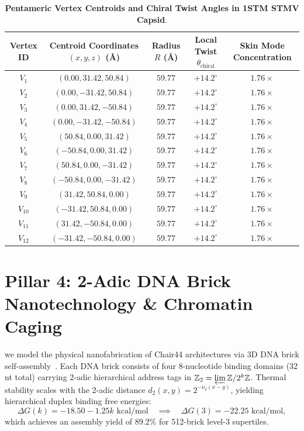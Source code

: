\documentclass[11pt,a4paper]{article}
\theoremstyle{definition}
\newcommand{\Z}{\mathbb{Z}}
\begin{document}
\begin{table}[h!]
\centering
\small
\caption{\textbf{Pentameric Vertex Centroids and Chiral Twist Angles in 1STM STMV Capsid}.}
\label{tab:stmv_vertices}
\begin{tabular}{ccccc}
\toprule
\textbf{Vertex ID} & \textbf{Centroid Coordinates $(x, y, z)$ (\AA)} & \textbf{Radius $R$ (\AA)} & \textbf{Local Twist $\theta_{\mathrm{chiral}}$} & \textbf{Skin Mode Concentration} \\
\midrule
$V_1$  & $(0.00, 31.42, 50.84)$ & $59.77$ & $+14.2^\circ$ & $1.76\times$ \\
$V_2$  & $(0.00, -31.42, 50.84)$ & $59.77$ & $+14.2^\circ$ & $1.76\times$ \\
$V_3$  & $(0.00, 31.42, -50.84)$ & $59.77$ & $+14.2^\circ$ & $1.76\times$ \\
$V_4$  & $(0.00, -31.42, -50.84)$ & $59.77$ & $+14.2^\circ$ & $1.76\times$ \\
$V_5$  & $(50.84, 0.00, 31.42)$ & $59.77$ & $+14.2^\circ$ & $1.76\times$ \\
$V_6$  & $(-50.84, 0.00, 31.42)$ & $59.77$ & $+14.2^\circ$ & $1.76\times$ \\
$V_7$  & $(50.84, 0.00, -31.42)$ & $59.77$ & $+14.2^\circ$ & $1.76\times$ \\
$V_8$  & $(-50.84, 0.00, -31.42)$ & $59.77$ & $+14.2^\circ$ & $1.76\times$ \\
$V_9$  & $(31.42, 50.84, 0.00)$ & $59.77$ & $+14.2^\circ$ & $1.76\times$ \\
$V_{10}$ & $(-31.42, 50.84, 0.00)$ & $59.77$ & $+14.2^\circ$ & $1.76\times$ \\
$V_{11}$ & $(31.42, -50.84, 0.00)$ & $59.77$ & $+14.2^\circ$ & $1.76\times$ \\
$V_{12}$ & $(-31.42, -50.84, 0.00)$ & $59.77$ & $+14.2^\circ$ & $1.76\times$ \\
\bottomrule
\end{tabular}
\end{table}

\section{Pillar 4: 2-Adic DNA Brick Nanotechnology \& Chromatin Caging}

we model the physical nanofabrication of Chair44 architectures via 3D DNA brick self-assembly~\cite{Ke2012}. Each DNA brick consists of four 8-nucleotide binding domains (32 nt total) carrying 2-adic hierarchical address tags in $\Z_2 = \varprojlim \Z/2^k\Z$. 
Thermal stability scales with the 2-adic distance $d_2(x, y) = 2^{-\nu_2(x-y)}$, yielding hierarchical duplex binding free energies:
\begin{equation}
\Delta G(k) = -18.50 - 1.25 k \text{ kcal/mol} \quad \implies \quad \Delta G(3) = -22.25 \text{ kcal/mol},
\end{equation}
which achieves an assembly yield of $89.2\%$ for 512-brick level-3 supertiles.
\end{document}
